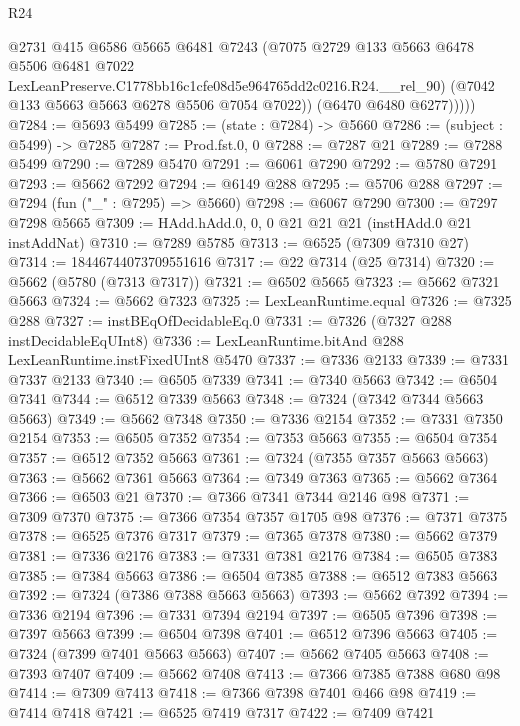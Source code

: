 \begin{lexlean}{R24}
\begin{coremodule}
              @2731
              @415
              @6586
              @5665
              @6481
              @7243
              (@7075
                @2729
                @133
                @5663
                @6478
                @5506
                @6481
                @7022
                LexLeanPreserve.C1778bb16c1cfe08d5e964765dd2c0216.R24.__rel_90)
              (@7042 @133 @5663 @5663 @6278 @5506 @7054 @7022))
            (@6470 @6480 @6277)))))
@7284 := @5693 @5499
@7285 := (state : @7284) -> @5660
@7286 := (subject : @5499) -> @7285
@7287 := Prod.fst.{0, 0}
@7288 := @7287 @21
@7289 := @7288 @5499
@7290 := @7289 @5470
@7291 := @6061 @7290
@7292 := @5780 @7291
@7293 := @5662 @7292
@7294 := @6149 @288
@7295 := @5706 @288
@7297 := @7294 (fun ("_" : @7295) => @5660)
@7298 := @6067 @7290
@7300 := @7297 @7298 @5665
@7309 := HAdd.hAdd.{0, 0, 0} @21 @21 @21 (instHAdd.{0} @21 instAddNat)
@7310 := @7289 @5785
@7313 := @6525 (@7309 @7310 @27)
@7314 := 18446744073709551616
@7317 := @22 @7314 (@25 @7314)
@7320 := @5662 (@5780 (@7313 @7317))
@7321 := @6502 @5665
@7323 := @5662 @7321 @5663
@7324 := @5662 @7323
@7325 := LexLeanRuntime.equal
@7326 := @7325 @288
@7327 := instBEqOfDecidableEq.{0}
@7331 := @7326 (@7327 @288 instDecidableEqUInt8)
@7336 := LexLeanRuntime.bitAnd @288 LexLeanRuntime.instFixedUInt8 @5470
@7337 := @7336 @2133
@7339 := @7331 @7337 @2133
@7340 := @6505 @7339
@7341 := @7340 @5663
@7342 := @6504 @7341
@7344 := @6512 @7339 @5663
@7348 := @7324 (@7342 @7344 @5663 @5663)
@7349 := @5662 @7348
@7350 := @7336 @2154
@7352 := @7331 @7350 @2154
@7353 := @6505 @7352
@7354 := @7353 @5663
@7355 := @6504 @7354
@7357 := @6512 @7352 @5663
@7361 := @7324 (@7355 @7357 @5663 @5663)
@7363 := @5662 @7361 @5663
@7364 := @7349 @7363
@7365 := @5662 @7364
@7366 := @6503 @21
@7370 := @7366 @7341 @7344 @2146 @98
@7371 := @7309 @7370
@7375 := @7366 @7354 @7357 @1705 @98
@7376 := @7371 @7375
@7378 := @6525 @7376 @7317
@7379 := @7365 @7378
@7380 := @5662 @7379
@7381 := @7336 @2176
@7383 := @7331 @7381 @2176
@7384 := @6505 @7383
@7385 := @7384 @5663
@7386 := @6504 @7385
@7388 := @6512 @7383 @5663
@7392 := @7324 (@7386 @7388 @5663 @5663)
@7393 := @5662 @7392
@7394 := @7336 @2194
@7396 := @7331 @7394 @2194
@7397 := @6505 @7396
@7398 := @7397 @5663
@7399 := @6504 @7398
@7401 := @6512 @7396 @5663
@7405 := @7324 (@7399 @7401 @5663 @5663)
@7407 := @5662 @7405 @5663
@7408 := @7393 @7407
@7409 := @5662 @7408
@7413 := @7366 @7385 @7388 @680 @98
@7414 := @7309 @7413
@7418 := @7366 @7398 @7401 @466 @98
@7419 := @7414 @7418
@7421 := @6525 @7419 @7317
@7422 := @7409 @7421

\end{coremodule}
\end{lexlean}

